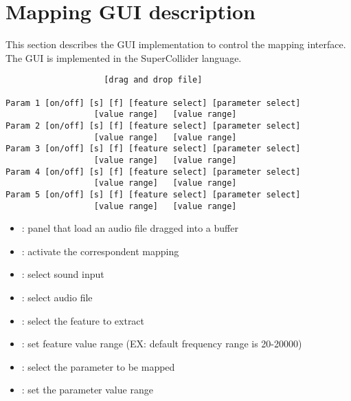 \documentclass[11pt,oneside]{article}
\begin{document}
\section{Mapping GUI description}
This section describes the GUI implementation to control the mapping interface. The GUI is implemented in the SuperCollider language.
\begin{verbatim}
					[drag and drop file]

Param 1 [on/off] [s] [f] [feature select] [parameter select]
				  [value range]   [value range]
Param 2 [on/off] [s] [f] [feature select] [parameter select]
				  [value range]   [value range]
Param 3 [on/off] [s] [f] [feature select] [parameter select]
				  [value range]   [value range]
Param 4 [on/off] [s] [f] [feature select] [parameter select]
				  [value range]   [value range]
Param 5 [on/off] [s] [f] [feature select] [parameter select]
				  [value range]   [value range]
\end{verbatim}

\begin{itemize}
    \item [drag and drop file]: panel that load an audio file dragged into a buffer
    \item [on/off]: activate the correspondent mapping
    \item [s]: select sound input
    \item [f]: select audio file
    \item [feature select]: select the feature to extract
    \item [value range]: set feature value range (EX: default frequency range is 20-20000)
    \item [parameter select]: select the parameter to be mapped
    \item [value range]: set the parameter value range
\end{itemize}
\end{document}
